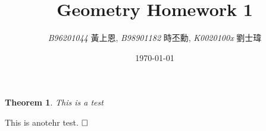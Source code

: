 \documentclass[11pt]{article}
\newcounter{probnum}
\newtheorem{theorem}{Theorem}[probnum]
\newcommand{\EOP}{$\hfill \square$}
\begin{document}
\begin{CJK}{UTF8}{cwmb}
\title{Geometry Homework 1}
\author{{\it{B96201044}} 黃上恩, {\it{B98901182}} 時丕勳, {\it{K0020100x}} 劉士瑋}
\date{\today}
\maketitle

\begin{theorem}
This is a test
\end{theorem}
This is anotehr test. \EOP

\end{CJK}
\newpage
\end{document}
